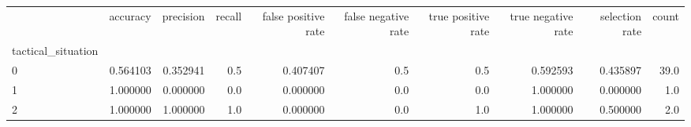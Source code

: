 \begin{tabular}{lrrrrrrrrr}
\toprule
{} &  accuracy &  precision &  recall &  false positive rate &  false negative rate &  true positive rate &  true negative rate &  selection rate &  count \\
tactical\_situation &           &            &         &                      &                      &                     &                     &                 &        \\
\midrule
0                  &  0.564103 &   0.352941 &     0.5 &             0.407407 &                  0.5 &                 0.5 &            0.592593 &        0.435897 &   39.0 \\
1                  &  1.000000 &   0.000000 &     0.0 &             0.000000 &                  0.0 &                 0.0 &            1.000000 &        0.000000 &    1.0 \\
2                  &  1.000000 &   1.000000 &     1.0 &             0.000000 &                  0.0 &                 1.0 &            1.000000 &        0.500000 &    2.0 \\
\bottomrule
\end{tabular}
